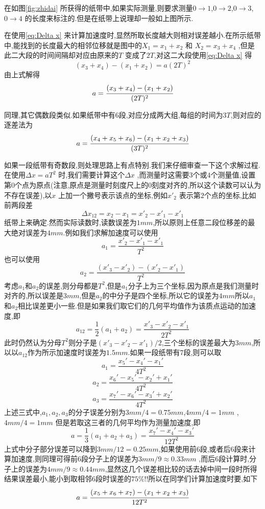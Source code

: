 在如图\ref{fig:zhidai} 所获得的纸带中,如果实际测量,则要求测量$0\rightarrow 1$,$0\rightarrow 2$,$0\rightarrow 3$,$0\rightarrow 4$ 的长度来标注的.但是在纸带上说理却一般如上图所示.

在使用\eqref{eq:Delta x} 来计算加速度时,显然所取长度越大则相对误差越小.在所示纸带中,能找到的长度最大的相邻位移就是图中的$X_1=x_1+x_2$ 和 $X_2=x_3+x_4$ ,但是此二大段的时间间隔却对应由原来的$T$ 变成了$2T$,对这二大段使用\eqref{eq:Delta x} 得
$$(x_3+x_4)-(x_1+x_2)=a(2T)^2$$
由上式解得
$$a=\cfrac{(x_3+x_4)-(x_1+x_2)}{(2T)^2}$$

同理,其它偶数段类似.如果纸带中有6段,对应分成两大组,每组的时间为$3T$,则对应的逐差法为
\begin{equation}
a=\cfrac{(x_4+x_5+x_6)-(x_1+x_2+x_3)}{(3T)^2}
  \label{eq:zhucha}
\end{equation}


如果{\heiti 一段纸带有奇数段},则处理思路上有点特别.我们来仔细审查一下这个求解过程.在使用$\Delta x =aT^2$ 时,我们需要计算这个$\Delta x$ ,而测量时这需要$3$个或$4$个测量值,设置第$0$个点为原点(注意,原点是测量时刻度尺上的$0$刻度对齐的,所以这个读数可以认为不存在误差),以$x$ 上加一个撇号表示该点的坐标,例如$x'_2$ 表示第$2$个点的坐标,比如前两段差
$$\Delta x_{12}=x_2-x_1=x'_2-x'_1-x'_1$$
纸带上来确定.然而实际读数时,读数误差为$1mm$,所以原则上任意二段位移差的最大绝对误差为$4mm$.例如我们求解加速度可以使用 
$$a_1=\frac{x'_2-x'_1-x'_1}{T^2}$$
也可以使用
$$a_2=\frac{(x'_3-x'_2)-(x'_2-x'_1)}{T^2}$$
考虑$a_1$和$a_2$的误差,则分母都是$T^2$,但是$a_1$分子上为三个坐标,因为原点是我们测量时对齐的,所以误差是$3mm$,但是$a_2$的中分子是四个坐标,所以它的误差为$4mm$所以$a_1$和$a_2$相比误差更小一些.但是如果我们取它们的几何平均值作为该质点运动的加速度,即
$$a_{12}=\frac{1}{2}(a_1+a_2)=\frac{x'_3-x'_2-x'_1}{2T^2}$$
此时仍然认为分母$T^2$则分子是$(x'_3-x'_2-x'_1)/2$,三个坐标的误差最大为$3mm$,所以以$a_{12}$作为所示加速度时误差为$1.5mm$.如果一段纸带有$7$段,则可以取
$$a_1=\frac{x_5'-x_4'-x_1'}{4T^2}$$
$$a_2=\frac{x_6'-x_5'-x_2'+x_1'}{4T^2}$$
$$a_3=\frac{x_7'-x_6'-x_3'+x_2'}{4T^2}$$
上述三式中,$a_1,a_2,a_3$的分子误差分别为$3mm/4=0.75mm$,$4mm/4=1mm$ ,$4mm/4=1mm$ 但是若取这三者的几何平均作为测量加速度,即
$$a=\frac{1}{3}(a_1+a_2+a_3)=\frac{x_7'-x_4'-x_3'}{12T^2}$$
上式中分子部分误差可以降到$3mm/12=0.25mm$,如果使用前$6$段,或者后$6$段来计算加速度,则同理可得前$6$段分子上的误差为$3mm/9\approx 0.33mm$ ,而后$6$段计算时,分子上的误差为$4mm/9\approx 0.44mm$,显然这几个误差相比较的话去掉中间一段时所得结果误差最小,能小到取相邻$6$段时误差的$75\%$!!所以在同学们计算加速度时要,如下
$$a=\cfrac{(x_5+x_6+x_7)-(x_1+x_2+x_3)}{12T^2}$$

